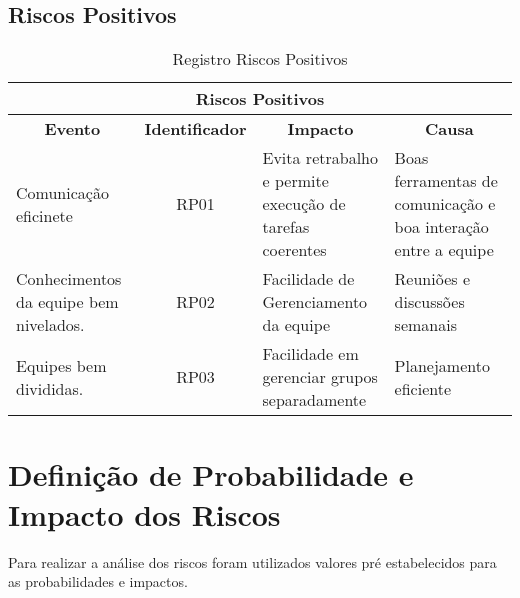 \pagebreak

\subsection{Riscos Positivos}
\begin{table}[h]
  \centering
  \caption{Registro Riscos Positivos}
  \begin{tabular}{|l|c|l|l|}
    \hline
    \multicolumn{4}{|c|}{\textbf{Riscos Positivos}}                                                                                                                                             \\ \hline
    \multicolumn{1}{|c|}{\textbf{Evento}}  & \textbf{Identificador} & \multicolumn{1}{c|}{\textbf{Impacto}}                    & \multicolumn{1}{c|}{\textbf{Causa}}                            \\ \hline
    \parbox[t]{4cm}{Comunicação eficinete}                  & RP01                   & \parbox[t]{4.5cm}{Evita retrabalho e permite execução de tarefas coerentes} & \parbox[t]{4.5cm}{Boas ferramentas de comunicação e boa interação entre a equipe} \\ \hline
    \parbox[t]{4cm}{Conhecimentos da equipe bem nivelados.} & RP02                   & \parbox[t]{4.5cm}{Facilidade de Gerenciamento da equipe}                    & \parbox[t]{4.5cm}{Reuniões e discussões semanais}                                 \\ \hline
    \parbox[t]{4cm}{Equipes bem divididas.}                 & RP03                   & \parbox[t]{4.5cm}{Facilidade em gerenciar grupos separadamente}             & \parbox[t]{4.5cm}{Planejamento eficiente}                                         \\ \hline
  \end{tabular}
\end{table}

\pagebreak

\section{Definição de Probabilidade e Impacto dos Riscos}
Para realizar a análise dos riscos foram utilizados valores pré estabelecidos para as probabilidades e impactos.
